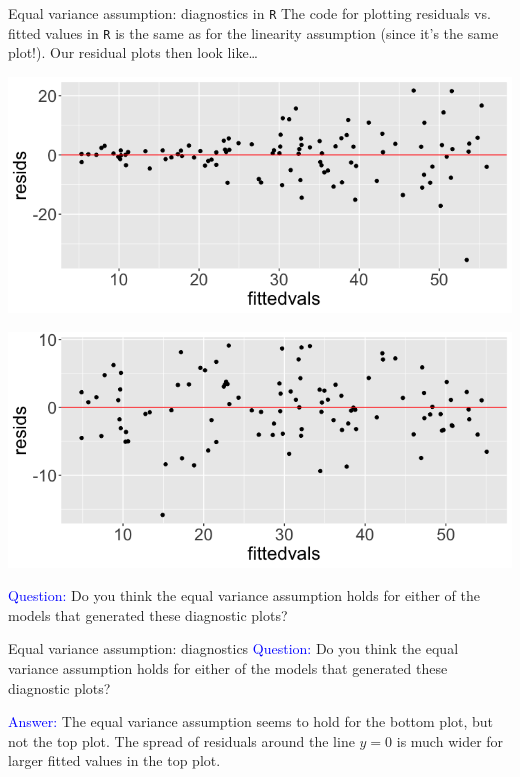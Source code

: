 \documentclass[10pt,t]{beamer}
\begin{document}
\begin{frame}{Equal variance assumption: diagnostics in \texttt{R}}
The code for plotting residuals vs. fitted values in \texttt{R} is the same as for the linearity assumption (since it's the same plot!). Our residual plots then look like\dots

\centering

\includegraphics[scale=0.2]{eqvar_resids1.png}

\includegraphics[scale=0.2]{eqvar_resids2.png} \pause

\textcolor{blue}{Question:} Do you think the equal variance assumption holds for either of the models that generated these diagnostic plots?

\end{frame}

\begin{frame}{Equal variance assumption: diagnostics}
\textcolor{blue}{Question:} Do you think the equal variance assumption holds for either of the models that generated these diagnostic plots?

\vspace{0.3cm}

\textcolor{blue}{Answer:} The equal variance assumption seems to hold for the bottom plot, but not the top plot. The spread of residuals around the line $y = 0$ is much wider for larger fitted values in the top plot. 
\end{frame}
\end{document}

